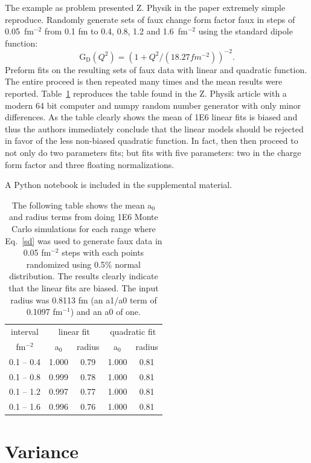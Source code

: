 \documentclass[10pt,aps,prc,twocolumn]{revtex4-1}
\begin{document}
The example as problem presented Z. Physik in the paper extremely simple reproduce.   
Randomly generate sets of faux change form factor faux in steps of 0.05~fm$^{-2}$ from 0.1 fm to 0.4, 0.8, 1.2
and 1.6~fm$^{-2}$ using the standard dipole function:
\begin{equation}
\label{sd}
\mathrm{G_D}(Q^2) = ( 1 + Q^2/(18.27 fm^{-2}))^{-2}.
\end{equation}
Preform fits on the resulting sets of faux data with linear and quadratic function.    The entire proceed is
then repeated many times and the mean results were reported.   Table~\ref{ztable} reproduces the table found in the
Z. Physik article with a modern 64 bit computer and numpy random number generator with only minor differences.
As the table clearly shows the mean of 1E6 linear fits is biased and thus the authors immediately conclude that 
the linear models should be rejected in favor of the less non-biased quadratic function.   In fact, then then proceed to not only
do two parameters fits; but fits with five parameters: two in the charge form factor and three floating normalizations.

A Python notebook is included in the supplemental material.

\begin{table}
\label{ztable}
\caption{The following table shows the mean a$_0$ and radius terms from doing 1E6 Monte Carlo simulations
for each range
where Eq.~\ref{sd} was used to generate faux data in 0.05 fm$^{-2}$ steps with each points randomized using
0.5\% normal distribution.   The results clearly indicate that the linear fits are biased.   The input
radius was 0.8113 fm (an a1/a0 term of 0.1097 fm$^{-1}$) and an a0 of one.}
\begin{tabular}{c|cc|cc} \hline
interval       & \multicolumn{2}{c|}{linear fit} & \multicolumn{2}{c}{quadratic fit}  \\
fm$^{-2}$      & a$_0$      & radius          & a$_0$    & radius \\ \hline
 0.1 -- 0.4 & 1.000& 0.79& 1.000& 0.81 \\
 0.1 -- 0.8 & 0.999& 0.78& 1.000& 0.81 \\
 0.1 -- 1.2 & 0.997& 0.77& 1.000& 0.81 \\
 0.1 -- 1.6 & 0.996& 0.76& 1.000& 0.81 \\ \hline
\end{tabular}
\end{table}

\section{Variance}
\end{document}
